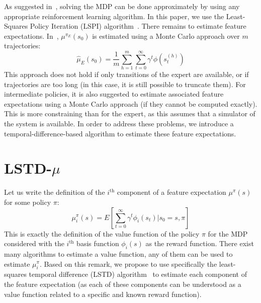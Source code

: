 \documentclass{llncs}
\begin{document}
As suggested in~\citep{abbeel2004apprenticeship}, solving the MDP can be done
approximately by using any appropriate reinforcement learning
algorithm. In this paper, we use the Least-Squares Policy Iteration
(LSPI) algorithm~\citep{lagoudakis2003least}. There remains to estimate
feature expectations. In~\citep{abbeel2004apprenticeship}, $\mu^{\pi_E}(s_0)$ is
estimated using a Monte Carlo approach over $m$ trajectories:
\begin{equation}
  \hat{\mu}_E(s_0) = \frac{1}{m} \sum_{h=1}^m \sum_{t=0}^\infty
  \gamma^t \phi(s_t^{(h)})
\end{equation}
This approach does not hold if only transitions of the expert are
available, or if trajectories are too long (in this case, it is
still possible to truncate them). For intermediate policies, it is
also suggested to estimate associated feature expectations using a
Monte Carlo approach (if they cannot be computed exactly). This is
more constraining than for the expert, as this assumes that a
simulator of the system is available. In order to address these
problems, we introduce a temporal-difference-based algorithm to
estimate these feature expectations.

\section{LSTD-$\mu$}
\label{sec:lstdmu}
Let us write the definition of the $i^\text{th}$ component of a
feature expectation $\mu^\pi(s)$ for some policy $\pi$:
\begin{equation}
  \mu_i^\pi(s) = E[\sum_{t=0}^\infty \gamma^t \phi_i(s_t)|s_0=s,\pi]
  \label{eqn:phi}
\end{equation}
This is exactly the definition of the value function of the policy
$\pi$ for the MDP considered with the $i^\text{th}$ basis function
$\phi_i(s)$ as the reward function. There exist many algorithms to
estimate a value function, any of them can be used to estimate
$\mu_i^\pi$. Based on this remark, we propose to use specifically
the least-squares temporal difference (LSTD)
algorithm~\citep{bradtke1996linear} to estimate each component of the
feature expectation (as each of these components can be understood
as a value function related to a specific and known reward
function).
\end{document}
